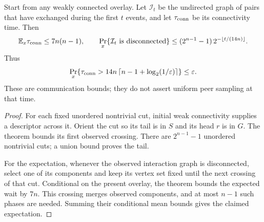 \begin{corollary}
\label{cor:c2readytemporal}
Start from any weakly connected overlay. Let
$\mathcal I_t$ be the undirected graph of pairs
that have exchanged during the first $t$ events,
and let $\tau_{\rm conn}$ be its connectivity time.
Then
\[
 \mathbb E_x\tau_{\rm conn}\le7n(n-1),
 \qquad
 \Pr_x\{\mathcal I_t\text{ is disconnected}\}
 \le(2^{n-1}-1)\,
       2^{-\lfloor t/(14n)\rfloor}.
\]
Thus
\[
 \Pr_x\!\left\{
 \tau_{\rm conn}>
 14n\left\lceil n-1+\log_2(1/\varepsilon)\right\rceil
 \right\}\le\varepsilon.
\]
These are communication bounds; they do not
assert uniform peer sampling at that time.
\end{corollary}

\begin{proof}
For each fixed unordered nontrivial cut, initial
weak connectivity supplies a descriptor across it.
Orient the cut so its tail is in $S$ and its
head $r$ is in $G$. The theorem bounds its
first observed crossing. There are
$2^{n-1}-1$ unordered nontrivial cuts; a union
bound proves the tail.

For the expectation, whenever the observed
interaction graph is disconnected, select one
of its components and keep its vertex set
fixed until the next crossing of that cut.
Conditional on the present overlay, the theorem
bounds the expected wait by $7n$.
This crossing merges observed components,
and at most $n-1$ such phases are needed.
Summing their conditional mean bounds gives
the claimed expectation.
\end{proof}

